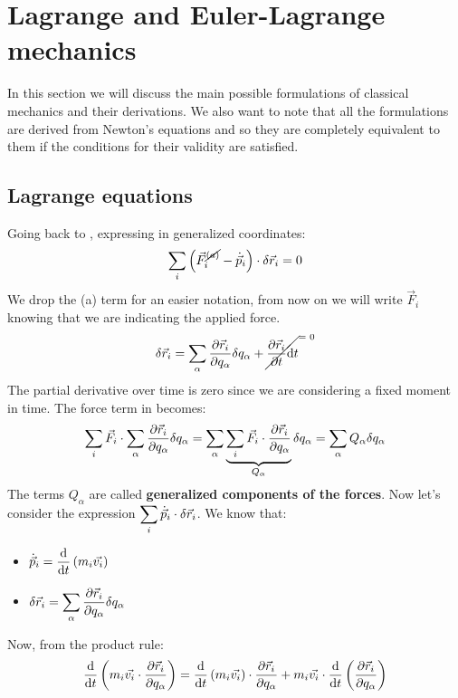 \chapter{Lagrange and Euler-Lagrange mechanics}
In this section we will discuss the main possible formulations of classical mechanics and their derivations. We also want to note that all the formulations are derived from Newton's equations and so they are completely equivalent to them if the conditions for their validity are satisfied.
\section{Lagrange equations}
Going back to \dalambertref, expressing in generalized coordinates:
\begin{equation}
    \displaystyle\sum_i \left(\vec{F}^{\cancel{(a)}}_i - \dot{\vec{p}}_i\right) \cdot \delta \vec{r}_i = 0
\end{equation}
We drop the (a) term for an easier notation, from now on we will write $\vec{F}_i$ knowing that we are indicating the applied force.
\begin{equation}
    \delta \vec{r}_i = \bigsum_{\alpha} \dfrac{\partial \vec{r}_i}{\partial q_{\alpha}} \delta q_{\alpha} + \crossout{\dfrac{\partial \vec{r}_i}{\partial t} \diff{t}}
\end{equation}
The partial derivative over time is zero since we are considering a fixed moment in time. The force term in \dalambertref\;becomes:
\begin{equation}
    \displaystyle\sum_i \vec{F}_i \cdot \displaystyle\sum_{\alpha} \dfrac{\partial \vec{r}_i}{\partial q_{\alpha}} \delta q_{\alpha} = \displaystyle\sum_{\alpha}\underbrace{\displaystyle\sum_{i} \vec{F}_i \cdot \dfrac{\partial \vec{r}_i}{\partial q_{\alpha}}}_{Q_{\alpha}} \delta q_{\alpha} = \displaystyle\sum_{\alpha}Q_{\alpha}\delta q_{\alpha}
\end{equation}
The terms $Q_{\alpha}$ are called \textbf{generalized components of the forces}.
Now let's consider the expression $\displaystyle\sum_i \dot{\vec{p}}_i \cdot \delta \vec{r}_i$. We know that:
\begin{itemize}
    \item $\dot{\vec{p}}_i = \dfrac{\mathrm{d} }{\mathrm{d}t}\left(m_i\vec{v_i}\right)$
    \item $\delta \vec{r}_i = \displaystyle\sum_{\alpha} \dfrac{\partial \vec{r}_i}{\partial q_{\alpha}}\delta q_{\alpha}$
\end{itemize}
Now, from the product rule:
\begin{equation} \label{e:total_deriv}
    \dfrac{\mathrm{d} }{\mathrm{d}t}\left(m_i\vec{v_i} \cdot \dfrac{\partial \vec{r}_i}{\partial q_{\alpha}}\right) = \dfrac{\mathrm{d} }{\mathrm{d}t}\left(m_i\vec{v_i}\right)\cdot \dfrac{\partial \vec{r}_i}{\partial q_{\alpha}} + m_i\vec{v_i} \cdot \dfrac{\mathrm{d} }{\mathrm{d}t}\left(\dfrac{\partial \vec{r}_i}{\partial q_{\alpha}}\right)
\end{equation}
